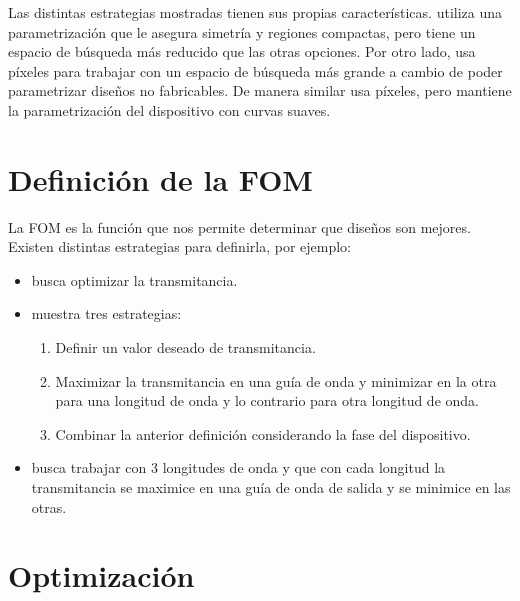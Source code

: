   Las distintas estrategias mostradas tienen sus propias características. 
  \cite{Prosopio-Galarza2019} utiliza una parametrización que le asegura simetría y regiones compactas, pero tiene un espacio de búsqueda más reducido que las otras opciones.
  Por otro lado, \cite{Su2020} usa píxeles para trabajar con un espacio de búsqueda más grande a cambio de poder parametrizar diseños no fabricables.
  De manera similar \cite{Piggott2017} usa píxeles, pero mantiene la parametrización del dispositivo con curvas suaves.


\section{Definición de la FOM}

La FOM es la función que nos permite determinar que diseños son mejores. Existen distintas estrategias para definirla, por ejemplo:

\begin{itemize}

  \item \cite{Prosopio-Galarza2019} busca optimizar la transmitancia.

  \item \cite{Su2020} muestra tres estrategias:

    \begin{enumerate}
      \item Definir un valor deseado de transmitancia.
      \item Maximizar la transmitancia en una guía de onda y minimizar en la otra para una longitud de onda y lo contrario para otra longitud de onda.
      \item Combinar la anterior definición considerando la fase del dispositivo.
    \end{enumerate}

  \item \cite{Piggott2017} busca trabajar con 3 longitudes de onda y que con cada longitud la transmitancia se maximice en una guía de onda de salida y se minimice en las otras.

\end{itemize}


\section{Optimización}


